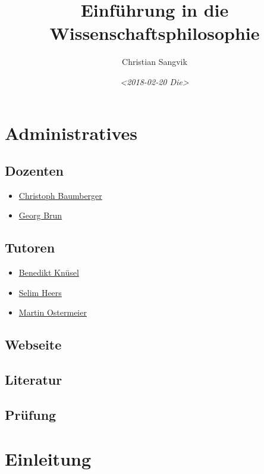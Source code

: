 \documentclass[11pt]{article}
\author{Christian Sangvik}
\date{\textit{<2018-02-20 Die>}}
\title{Einführung in die Wissenschaftsphilosophie}
\begin{document}
\maketitle
\tableofcontents


\section{Administratives}
\label{sec-1}

\subsection{Dozenten}
\label{sec-1-1}

\begin{itemize}
\item \href{mailto:christoph.baumberger@usys.ethz.ch}{Christoph Baumberger}
\item \href{mailto:georg.brun@usys.ethz.ch}{Georg Brun}
\end{itemize}

\subsection{Tutoren}
\label{sec-1-2}

\begin{itemize}
\item \href{mailto:benedikt.knueses@usys.ethz.ch}{Benedikt Knüsel}
\item \href{mailto:heerss@student.ethz.ch}{Selim Heers}
\item \href{mailto:martin.ostermeier@usys.ethz.ch}{Martin Ostermeier}
\end{itemize}

\subsection{Webseite}
\label{sec-1-3}

\subsection{Literatur}
\label{sec-1-4}

\subsection{Prüfung}
\label{sec-1-5}

\section{Einleitung}
\label{sec-2}
\end{document}
